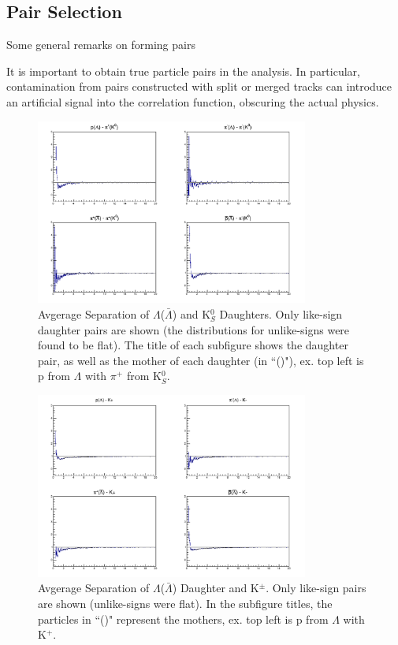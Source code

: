 \documentclass[../AnalysisNoteJBuxton.tex]{subfiles}
\begin{document}
\subsection{Pair Selection}
\label{PairSelection}

Some general remarks on forming pairs

It is important to obtain true particle pairs in the analysis.  In particular, contamination from pairs constructed with split or merged tracks can introduce an artificial signal into the correlation function, obscuring the actual physics.

\begin{figure}[h]
  \centering
  \includegraphics[width=0.8\textwidth]{3_DataSelection/Figures/AvgSepCFs_LamK0.pdf}
  \caption[Avgerage Separation of $\Lambda$($\bar{\Lambda}$) and K$^{0}_{S}$ Daughters]{Avgerage Separation of $\Lambda$($\bar{\Lambda}$) and K$^{0}_{S}$ Daughters.  Only like-sign daughter pairs are shown (the distributions for unlike-signs were found to be flat).  The title of each subfigure shows the daughter pair, as well as the mother of each daughter (in ``()"),  ex. top left is p from $\Lambda$ with $\pi^{+}$ from K$^{0}_{S}$.}
  \label{fig:AvgSepLamK0}
\end{figure}

\begin{figure}[h]
  \centering
  \includegraphics[width=0.8\textwidth]{3_DataSelection/Figures/AvgSepCFs_LamKch.pdf}
  \caption[Avgerage Separation of $\Lambda$($\bar{\Lambda}$) Daughter and K$^{\pm}$]{Avgerage Separation of $\Lambda$($\bar{\Lambda}$) Daughter and K$^{\pm}$.  Only like-sign pairs are shown (unlike-signs were flat).  In the subfigure titles, the particles in ``()" represent the mothers, ex. top left is p from $\Lambda$ with K$^{+}$.}
  \label{fig:AvgSepLamKch}
\end{figure}
\end{document}
